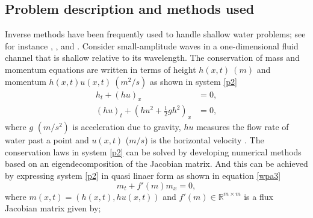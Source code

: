 \documentclass[11pt,a4paper]{article}
\begin{document}
	\subsection*{Problem description and methods used}
	Inverse methods  have been frequently used to handle shallow water problems; see for instance   \citet{monnier2016inverse}, \citet{gessese2012direct}, and \citet{voronina2013inverse}.
	Consider small-amplitude waves in a one-dimensional fluid channel that is shallow relative to its wavelength. The conservation of mass and  momentum equations are written in terms of  height $h(x,t)~(m)$ and momentum $h(x,t)u(x,t)~(m^{2}/s)$ as shown in system \eqref{p2}
	\begin{equation}
		\begin{aligned}
			h_{t} + (hu)_x &= 0, \\
			(hu)_t + \left(hu^{2} + \frac{1}{2} gh^{2} \right)_x & = 0,
		\end{aligned}
		\label{p2}
	\end{equation}	
	where $g$ $(m/s^{2})$ is acceleration due to gravity, $hu$ measures the flow rate of water past a point and $u(x,t)$ ($m/s$) is the horizontal velocity  \citep{leveque2002finite,toro2001shock}.  
	The conservation laws in system \eqref{p2} can be solved by developing numerical methods based on an eigendecomposition of the Jacobian matrix.  And this can be achieved by expressing system \eqref{p2} in quasi linaer form as shown in equation \eqref{wpa3}
	\begin{equation}
		m_{t} + f'(m)m_{x} = 0,
		\label{wpa3}
	\end{equation}
	where  $m(x,t) = (h(x,t), hu(x,t))$  and  $f'(m) \in \mathbb{R}^{m\times m}$  is a flux Jacobian matrix given by;
	
\end{document}
